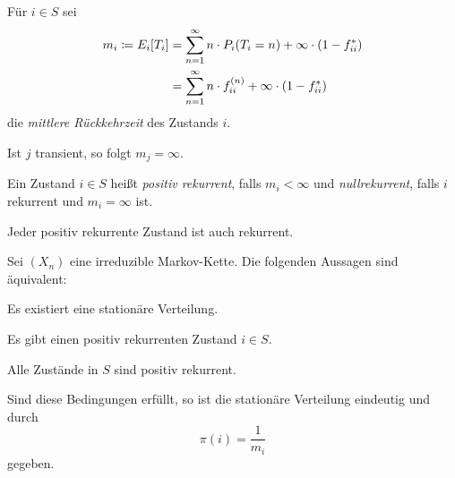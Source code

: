 \documentclass[a4paper,twoside,DIV15,BCOR12mm]{scrbook}
\begin{document}
\begin{definition}
Für $i\in S$ sei
\begin{align*}
m_i \da E_i[T_i] &= \sum_{n=1}^\infty n \cdot P_i(T_i=n) + \infty \cdot (1-f_{ii}^*) \\
&= \sum_{n=1}^\infty  n\cdot f_{ii}^{(n)} + \infty \cdot (1-f_{ii}^*)
\end{align*}
die \emph{mittlere Rückkehrzeit} des Zustands $i$.
\end{definition}

\begin{bemerkung}
Ist $j$ transient, so folgt $m_j=\infty$.
\end{bemerkung}

\begin{definition}
Ein Zustand $i\in S$ heißt \emph{positiv rekurrent}, falls $m_i<\infty$ und \emph{nullrekurrent}, falls $i$ rekurrent und $m_i=\infty$ ist.
\end{definition}

\begin{bemerkung}
Jeder positiv rekurrente Zustand ist auch rekurrent.
\end{bemerkung}

\begin{satz}
\label{satz3.2}Sei $(X_n)$ eine irreduzible Markov-Kette. Die folgenden Aussagen sind äquivalent:
\begin{enumi}
\item Es existiert eine stationäre Verteilung.
\item Es gibt einen positiv rekurrenten Zustand $i\in S$.
\item Alle Zustände in $S$ sind positiv rekurrent.
\end{enumi}
Sind diese Bedingungen erfüllt, so ist die stationäre Verteilung eindeutig und durch \[\pi(i)=\frac 1 {m_i}\] gegeben.
\end{satz}
\end{document}
